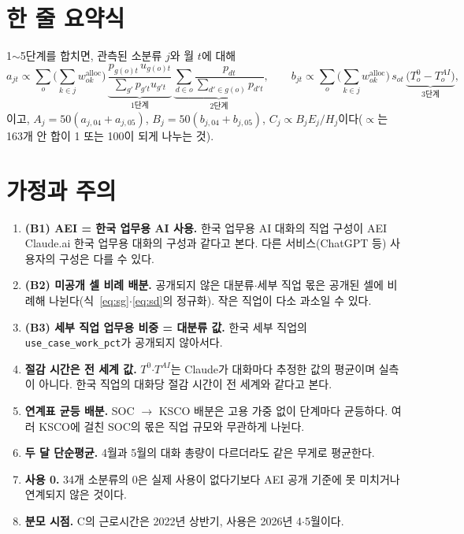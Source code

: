\documentclass[11pt]{article}
\begin{document}
\section{한 줄 요약식}

1$\sim$5단계를 합치면, 관측된 소분류 $j$와 월 $t$에 대해
\[
a_{jt} \propto \sum_{o} \Big(\sum_{k \in j} w^{\text{alloc}}_{ok}\Big)\,
\underbrace{\frac{p_{g(o)t}\, u_{g(o)t}}{\sum_{g'} p_{g't} u_{g't}}}_{\text{1단계}}\,
\underbrace{\sum_{d \in o} \frac{p_{dt}}{\sum_{d' \in g(o)} p_{d't}}}_{\text{2단계}},
\qquad
b_{jt} \propto \sum_{o} \Big(\sum_{k \in j} w^{\text{alloc}}_{ok}\Big)\, s_{ot}\,
\underbrace{\big(T^{0}_o - T^{AI}_o\big)}_{\text{3단계}},
\]
이고, $A_j = 50(a_{j,04} + a_{j,05})$, $B_j = 50(b_{j,04} + b_{j,05})$, $C_j \propto B_j E_j / H_j$이다($\propto$는 163개 안 합이 1 또는 100이 되게 나누는 것).

\section{가정과 주의}

\begin{enumerate}[leftmargin=*]
  \item \textbf{(B1) AEI = 한국 업무용 AI 사용.} 한국 업무용 AI 대화의 직업 구성이 AEI Claude.ai 한국 업무용 대화의 구성과 같다고 본다. 다른 서비스(ChatGPT 등) 사용자의 구성은 다를 수 있다.
  \item \textbf{(B2) 미공개 셀 비례 배분.} 공개되지 않은 대분류$\cdot$세부 직업 몫은 공개된 셀에 비례해 나뉜다(식~\eqref{eq:sg}$\cdot$\eqref{eq:sd}의 정규화). 작은 직업이 다소 과소일 수 있다.
  \item \textbf{(B3) 세부 직업 업무용 비중 = 대분류 값.} 한국 세부 직업의 \texttt{use\_case\_work\_pct}가 공개되지 않아서다.
  \item \textbf{절감 시간은 전 세계 값.} $T^{0}$$\cdot$$T^{AI}$는 Claude가 대화마다 추정한 값의 평균이며 실측이 아니다. 한국 직업의 대화당 절감 시간이 전 세계와 같다고 본다.
  \item \textbf{연계표 균등 배분.} SOC $\to$ KSCO 배분은 고용 가중 없이 단계마다 균등하다. 여러 KSCO에 걸친 SOC의 몫은 직업 규모와 무관하게 나뉜다.
  \item \textbf{두 달 단순평균.} 4월과 5월의 대화 총량이 다르더라도 같은 무게로 평균한다.
  \item \textbf{사용 0.} 34개 소분류의 0은 실제 사용이 없다기보다 AEI 공개 기준에 못 미치거나 연계되지 않은 것이다.
  \item \textbf{분모 시점.} C의 근로시간은 2022년 상반기, 사용은 2026년 4$\cdot$5월이다.
\end{enumerate}
\end{document}
